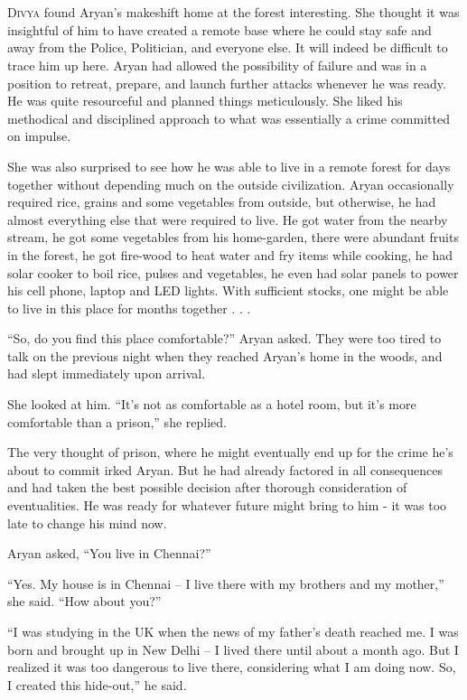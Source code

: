 \chapter{}

\lettrine{D}{ivya} found Aryan's makeshift home at the forest interesting. She thought it was
insightful of him to have created a remote base where he could stay safe and
away from the Police, Politician, and everyone else. It will indeed be difficult
to trace him up here. Aryan had allowed the possibility of failure and was in a
position to retreat, prepare, and launch further attacks whenever he was ready.
He was quite resourceful and planned things meticulously. She liked his
methodical and disciplined approach to what was essentially a crime committed on
impulse.

She was also surprised to see how he was able to live in a remote forest for
days together without depending much on the outside civilization. Aryan
occasionally required rice, grains and some vegetables from outside, but
otherwise, he had almost everything else that were required to live. He got
water from the nearby stream, he got some vegetables from his home-garden, there
were abundant fruits in the forest, he got fire-wood to heat water and fry items
while cooking, he had solar cooker to boil rice, pulses and vegetables, he even
had solar panels to power his cell phone, laptop and LED lights. With sufficient
stocks, one might be able to live in this place for months together . . .

“So, do you find this place comfortable?” Aryan asked. They were too tired to
talk on the previous night when they reached Aryan's home in the woods, and had
slept immediately upon arrival.

She looked at him. “It's not as comfortable as a hotel room, but it's more
comfortable than a prison,” she replied.

The very thought of prison, where he might eventually end up for the crime he's
about to commit irked Aryan. But he had already factored in all consequences and
had taken the best possible decision after thorough consideration of
eventualities. He was ready for whatever future might bring to him - it was too
late to change his mind now.

Aryan asked, “You live in Chennai?”

“Yes. My house is in Chennai – I live there with my brothers and my mother,” she
said. “How about you?”

“I was studying in the UK when the news of my father's death reached me. I was
born and brought up in New Delhi – I lived there until about a month ago. But I
realized it was too dangerous to live there, considering what I am doing now.
So, I created this hide-out,” he said.


